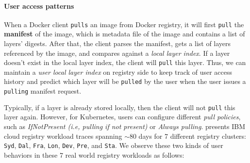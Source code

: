 \paragraph{User access patterns} When a Docker client \texttt{pulls} an image
from Docker registry, it will first \texttt{pull} the \textbf{manifest} of the
image, which is metadata file of the image and contains a list of layers'
digests.  After that, the client parses the manifest, gets a list of layers
referenced by the image, and compares against a \emph{local layer index}.  If a
layer doesn't exist in the local layer index, the client will \texttt{pull}
this layer.  Thus, we can maintain a \emph{user local layer index} on registry
side to keep track of user access history and predict which layer will be
\texttt{pulled} by the user when the user issues a \texttt{pulling} manifest
request.

Typically, if a layer is already stored locally, then the client will not
\texttt{pull} this layer again.  However, for Kubernetes, users can configure
different \emph{pull policies}, such as \emph{IfNotPresent (i.e, pulling if not
present)} or \emph{Always pulling}.  \cite{dockerworkload} presents IBM cloud
registry workload traces spanning $\sim$80 days for 7 different registry
clusters: \texttt{Syd}, \texttt{Dal}, \texttt{Fra}, \texttt{Lon}, \texttt{Dev},
\texttt{Pre}, and \texttt{Sta}.  We observe these two kinds of user behaviors
in these 7 real world registry workloads as follows:

